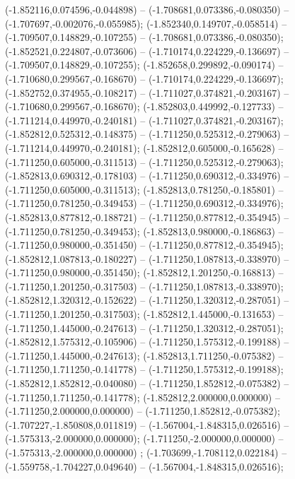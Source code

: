  (-1.852116,0.074596,-0.044898) -- (-1.708681,0.073386,-0.080350) -- (-1.707697,-0.002076,-0.055985);
 (-1.852340,0.149707,-0.058514) -- (-1.709507,0.148829,-0.107255) -- (-1.708681,0.073386,-0.080350);
 (-1.852521,0.224807,-0.073606) -- (-1.710174,0.224229,-0.136697) -- (-1.709507,0.148829,-0.107255);
 (-1.852658,0.299892,-0.090174) -- (-1.710680,0.299567,-0.168670) -- (-1.710174,0.224229,-0.136697);
 (-1.852752,0.374955,-0.108217) -- (-1.711027,0.374821,-0.203167) -- (-1.710680,0.299567,-0.168670);
 (-1.852803,0.449992,-0.127733) -- (-1.711214,0.449970,-0.240181) -- (-1.711027,0.374821,-0.203167);
 (-1.852812,0.525312,-0.148375) -- (-1.711250,0.525312,-0.279063) -- (-1.711214,0.449970,-0.240181);
 (-1.852812,0.605000,-0.165628) -- (-1.711250,0.605000,-0.311513) -- (-1.711250,0.525312,-0.279063);
 (-1.852813,0.690312,-0.178103) -- (-1.711250,0.690312,-0.334976) -- (-1.711250,0.605000,-0.311513);
 (-1.852813,0.781250,-0.185801) -- (-1.711250,0.781250,-0.349453) -- (-1.711250,0.690312,-0.334976);
 (-1.852813,0.877812,-0.188721) -- (-1.711250,0.877812,-0.354945) -- (-1.711250,0.781250,-0.349453);
 (-1.852813,0.980000,-0.186863) -- (-1.711250,0.980000,-0.351450) -- (-1.711250,0.877812,-0.354945);
 (-1.852812,1.087813,-0.180227) -- (-1.711250,1.087813,-0.338970) -- (-1.711250,0.980000,-0.351450);
 (-1.852812,1.201250,-0.168813) -- (-1.711250,1.201250,-0.317503) -- (-1.711250,1.087813,-0.338970);
 (-1.852812,1.320312,-0.152622) -- (-1.711250,1.320312,-0.287051) -- (-1.711250,1.201250,-0.317503);
 (-1.852812,1.445000,-0.131653) -- (-1.711250,1.445000,-0.247613) -- (-1.711250,1.320312,-0.287051);
 (-1.852812,1.575312,-0.105906) -- (-1.711250,1.575312,-0.199188) -- (-1.711250,1.445000,-0.247613);
 (-1.852813,1.711250,-0.075382) -- (-1.711250,1.711250,-0.141778) -- (-1.711250,1.575312,-0.199188);
 (-1.852812,1.852812,-0.040080) -- (-1.711250,1.852812,-0.075382) -- (-1.711250,1.711250,-0.141778);
 (-1.852812,2.000000,0.000000) -- (-1.711250,2.000000,0.000000) -- (-1.711250,1.852812,-0.075382);
 (-1.707227,-1.850808,0.011819) -- (-1.567004,-1.848315,0.026516) -- (-1.575313,-2.000000,0.000000);
 (-1.711250,-2.000000,0.000000) -- (-1.575313,-2.000000,0.000000) ;
 (-1.703699,-1.708112,0.022184) -- (-1.559758,-1.704227,0.049640) -- (-1.567004,-1.848315,0.026516);
